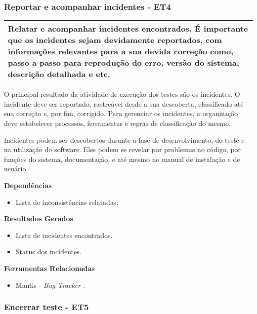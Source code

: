 \subsubsection{Reportar e acompanhar incidentes - ET4}
\label{sec:et4}

\begin{table}[H]
\centering
\begin{tabular}{|p{130mm}|}
\hline
Relatar e acompanhar incidentes encontrados. É importante que os incidentes sejam devidamente reportados, com informações relevantes para a sua devida correção como, passo a passo para reprodução do erro, versão do sistema, descrição detalhada e etc. \\ 
\hline
\end{tabular}
\end{table}

O principal resultado da atividade de execução dos testes são os incidentes. O incidente deve ser reportado, rastreável desde a sua descoberta, classificado até sua correção e, por fim, corrigido. Para gerenciar os incidentes, a organização deve estabelecer processos, ferramentas e regras de classificação do mesmo.

Incidentes podem ser descobertos durante a fase de desenvolvimento, do teste e na utilização do software. Eles podem se revelar por problemas no código, por funções do sistema, documentação, e até mesmo no manual de instalação e de usuário.

\textbf{Dependências}
\begin{itemize}
    \item Lista de inconsistências relatadas;
\end{itemize}

\textbf{Resultados Gerados}
\begin{itemize}
    \item Lista de incidentes encontrados.
    \item Status dos incidentes.
\end{itemize}

\textbf{Ferramentas Relacionadas}
\begin{itemize}
    \item Mantis - \textit{Bug Tracker} \cite{Mantis}.
\end{itemize}


\subsubsection{Encerrar teste - ET5}
\label{sec:et5}

